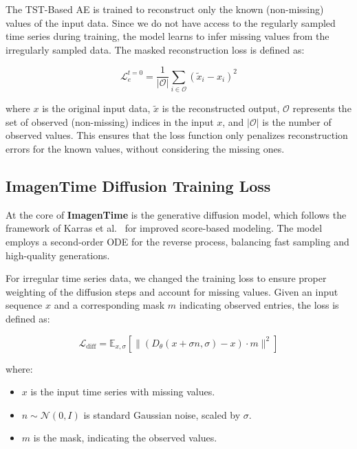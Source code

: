 \documentclass{article}
\theoremstyle{plain}
\theoremstyle{definition}
\theoremstyle{remark}
\begin{document}
The TST-Based AE is trained to reconstruct only the known (non-missing) values of the input data. Since we do not have access to the regularly sampled time series during training, the model learns to infer missing values from the irregularly sampled data. The masked reconstruction loss is defined as:

\begin{equation}
    \mathcal{L}_{e}^{t=0} = \frac{1}{|\mathcal{O}|} \sum_{i \in \mathcal{O}} (\tilde{x}_i - x_i)^2
\end{equation}

where $x$ is the original input data, $\tilde{x}$ is the reconstructed output, $\mathcal{O}$ represents the set of observed (non-missing) indices in the input $x$, and $|\mathcal{O}|$ is the number of observed values. This ensures that the loss function only penalizes reconstruction errors for the known values, without considering the missing ones.

\subsection{ImagenTime Diffusion Training Loss}

At the core of \textbf{ImagenTime} is the generative diffusion model, which follows the framework of Karras et al.~\cite{karras2022elucidating} for improved score-based modeling. The model employs a second-order ODE for the reverse process, balancing fast sampling and high-quality generations.

For irregular time series data, we changed the training loss to ensure proper weighting of the diffusion steps and account for missing values. Given an input sequence \( x \) and a corresponding mask \( m \) indicating observed entries, the loss is defined as:

\begin{equation}
    \mathcal{L}_{\text{diff}} = \mathbb{E}_{x, \sigma} \left[ \| (D_\theta(x + \sigma n, \sigma) - x) \cdot m \|^2 \right]
\end{equation}

where:

\begin{itemize}
    \item $ x $ is the input time series with missing values.
    \item $ n \sim \mathcal{N}(0, I) $ is standard Gaussian noise, scaled by $ \sigma $.
    \item $ m $ is the mask, indicating the observed values.
\end{itemize}
\end{document}
